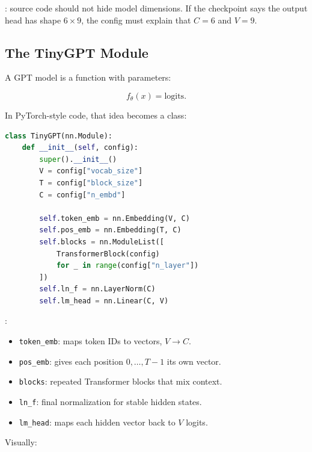 : source code should not hide model dimensions. If the checkpoint says the output head has shape \(6 \times 9\), the config must explain that \(C=6\) and \(V=9\).

\subsection{The TinyGPT Module}

A GPT model is a function with parameters:

\[
f_\theta(x) = \text{logits}.
\]

In PyTorch-style code, that idea becomes a class:

\begin{lstlisting}[language=Python]
class TinyGPT(nn.Module):
    def __init__(self, config):
        super().__init__()
        V = config["vocab_size"]
        T = config["block_size"]
        C = config["n_embd"]

        self.token_emb = nn.Embedding(V, C)
        self.pos_emb = nn.Embedding(T, C)
        self.blocks = nn.ModuleList([
            TransformerBlock(config)
            for _ in range(config["n_layer"])
        ])
        self.ln_f = nn.LayerNorm(C)
        self.lm_head = nn.Linear(C, V)
\end{lstlisting}

:

\begin{itemize}
  \item \texttt{token\_emb}: maps token IDs to vectors, \(V \rightarrow C\).
  \item \texttt{pos\_emb}: gives each position \(0,\ldots,T-1\) its own vector.
  \item \texttt{blocks}: repeated Transformer blocks that mix context.
  \item \texttt{ln\_f}: final normalization for stable hidden states.
  \item \texttt{lm\_head}: maps each hidden vector back to \(V\) logits.
\end{itemize}

Visually:

\begin{center}
\end{center}

